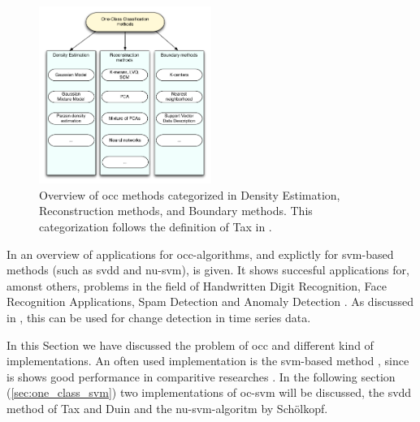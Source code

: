 \begin{figure}
  \centering
    \includegraphics[width=0.5\textwidth,keepaspectratio]{./Figures/chapter3/occ_methods.pdf}
  \caption[One-Class Classification methods]{Overview of \gls{occ} methods categorized in Density Estimation, Reconstruction methods, and Boundary methods. This categorization follows the definition of Tax in \cite{tax2001one}.}
  \label{fig:occ-methods}
\end{figure}

In \cite{khan2010survey,noumir2012simple} an overview of applications for \gls{occ}-algorithms, and explictly for \gls{svm}-based methods (such as \gls{svdd} and \gls{nu-svm}), is given.
It shows succesful applications for, amonst others, problems in the field of Handwritten Digit Recognition, Face Recognition Applications, Spam Detection and Anomaly Detection \cite{li2003improving,perdisci2006using}.
As discussed in , this can be used for change detection in time series data.

In this Section we have discussed the problem of \gls{occ} and different kind of implementations.
An often used implementation is the \gls{svm}-based method \cite{noumir2012simple}, since is shows good performance in comparitive researches \cite{khan2010survey,smola1998connection}.
In the following section (\ref{sec:one_class_svm}) two implementations of \gls{oc-svm} will be discussed, the \gls{svdd} method of Tax and Duin \cite{tax1999support} and the \gls{nu-svm}-algoritm by Sch\"olkopf.






